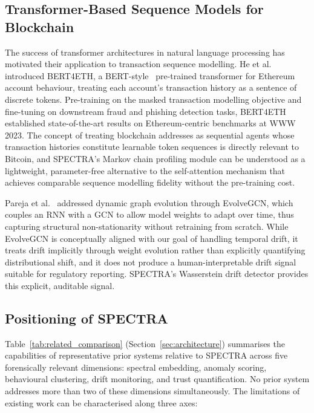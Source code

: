 \documentclass[journal]{IEEEtran}
\begin{document}
\subsection{Transformer-Based Sequence Models for Blockchain}
\label{subsec:transformers}

The success of transformer architectures in natural language processing has
motivated their application to transaction sequence modelling.  He et
al.~\cite{He2023} introduced BERT4ETH, a BERT-style~\cite{Lin2017}
pre-trained transformer for Ethereum account behaviour, treating each account's
transaction history as a sentence of discrete tokens.  Pre-training on the
masked transaction modelling objective and fine-tuning on downstream fraud and
phishing detection tasks, BERT4ETH established state-of-the-art results on
Ethereum-centric benchmarks at WWW 2023.  The concept of treating blockchain
addresses as sequential agents whose transaction histories constitute learnable
token sequences is directly relevant to Bitcoin, and SPECTRA's Markov chain
profiling module can be understood as a lightweight, parameter-free alternative
to the self-attention mechanism that achieves comparable sequence modelling
fidelity without the pre-training cost.

Pareja et al.~\cite{Pareja2020} addressed dynamic graph evolution through
EvolveGCN, which couples an RNN with a GCN to allow model weights to adapt over
time, thus capturing structural non-stationarity without retraining from
scratch.  While EvolveGCN is conceptually aligned with our goal of handling
temporal drift, it treats drift implicitly through weight evolution rather than
explicitly quantifying distributional shift, and it does not produce a
human-interpretable drift signal suitable for regulatory reporting.  SPECTRA's
Wasserstein drift detector provides this explicit, auditable signal.

\subsection{Positioning of SPECTRA}
\label{subsec:positioning}

Table~\ref{tab:related_comparison} (Section~\ref{sec:architecture}) summarises
the capabilities of representative prior systems relative to SPECTRA across
five forensically relevant dimensions: spectral embedding, anomaly scoring,
behavioural clustering, drift monitoring, and trust quantification.  No prior
system addresses more than two of these dimensions simultaneously.  The
limitations of existing work can be characterised along three axes:
\end{document}
